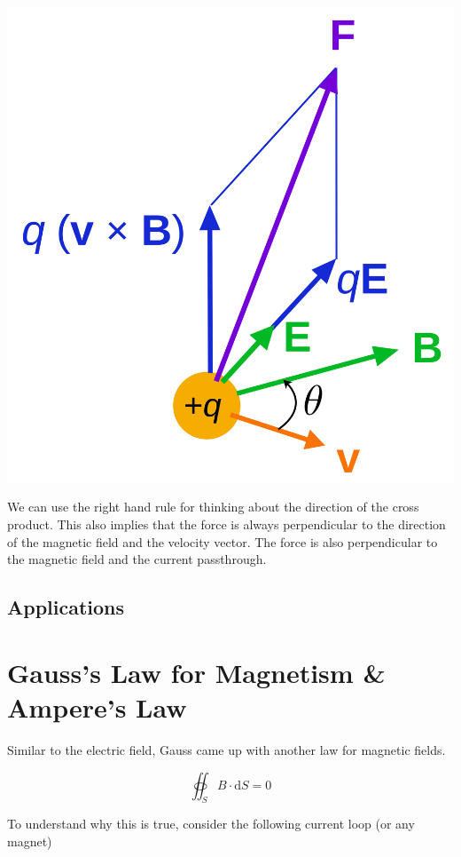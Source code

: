 \hfil \includegraphics[scale=0.075]{assets/lorentz-force.png}

We can use the right hand rule for thinking about the direction of the cross product. This also implies that the force is always perpendicular to the direction of the magnetic field and the velocity vector. The force is also perpendicular to the magnetic field and the current passthrough. 

\subsection{Applications}



\section{Gauss's Law for Magnetism \& Ampere's Law}

Similar to the electric field, Gauss came up with another law for magnetic fields.

\[\oiint_S B\cdot\mathrm{d}S = 0\]

To understand why this is true, consider the following current loop (or any magnet)

